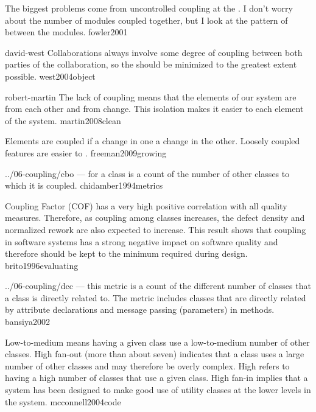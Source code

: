\documentclass{article}
\begin{document}
  {The biggest problems come from uncontrolled coupling at the . I don't worry about the number of modules coupled together, but I look at the pattern of  between the modules.}
  {fowler2001}

\lnQuote
  {david-west}
  {Collaborations always involve some degree of coupling between both parties of the collaboration, so the  should be minimized to the greatest extent possible.}
  {west2004object}

\lnQuote
  {robert-martin}
  {The lack of coupling means that the elements of our system are  from each other and from change. This isolation makes it easier to  each element of the system.}
  {martin2008clean}

  {Elements are coupled if a change in one  a change in the other. Loosely coupled features are easier to .}
  {freeman2009growing}


\lnQuote
  {../06-coupling/cbo}
  { --- for a class is a count of the number of other classes to which it is coupled.}
  {chidamber1994metrics}

  {Coupling Factor (COF) has a very high positive correlation with all quality measures. Therefore, as coupling among classes increases, the defect density and normalized rework are also expected to increase. This result shows that coupling in software systems has a strong negative impact on software quality and therefore should be kept to the minimum required during design.}
  {brito1996evaluating}

\lnQuote
  {../06-coupling/dcc}
  { --- this metric is a count of the different number of classes that a class is directly related to. The metric includes classes that are directly related by attribute declarations and message passing (parameters) in methods.}
  {bansiya2002}

  {Low-to-medium  means having a given class use a low-to-medium number of other classes. High fan-out (more than about seven) indicates that a class uses a large number of other classes and may therefore be overly complex. High  refers to having a high number of classes that use a given class. High fan-in implies that a system has been designed to make good use of utility classes at the lower levels in the system.}
  {mcconnell2004code}
\end{document}
